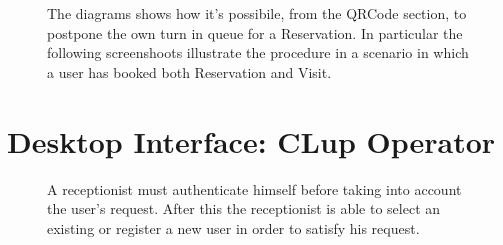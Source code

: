 \begin{figure}[H]
  \label{QRCode_handle}
  \centering
    \caption{The diagrams shows how it's possibile, from the QRCode section, to postpone the own turn in queue for a Reservation. In particular the following screenshoots illustrate the procedure in a scenario in which a user has booked both Reservation and Visit.}
\end{figure}

\section{Desktop Interface: CLup Operator}


\begin{figure}[H]
  \label{Receptionist1}
  \centering
    \caption{A receptionist must authenticate himself before taking into account the user's request. After this the receptionist is able to select an existing or register a new user in order to satisfy his request.}
\end{figure}



